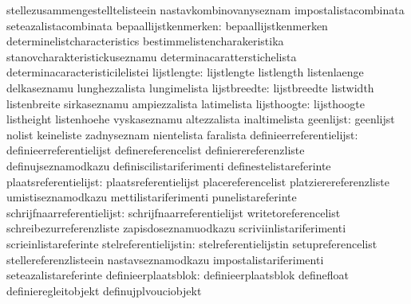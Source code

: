                                   stellezusammengestelltelisteein  nastavkombinovanyseznam
                                  impostalistacombinata            seteazalistacombinata
           bepaallijstkenmerken:  bepaallijstkenmerken             determinelistcharacteristics
                                  bestimmelistencharakeristika     stanovcharakteristickuseznamu
                                  determinacaratterstichelista     determinacaracteristicilelistei
                    lijstlengte:  lijstlengte                      listlength
                                  listenlaenge                     delkaseznamu
                                  lunghezzalista                   lungimelista
                   lijstbreedte:  lijstbreedte                     listwidth
                                  listenbreite                     sirkaseznamu
                                  ampiezzalista                    latimelista
                    lijsthoogte:  lijsthoogte                      listheight
                                  listenhoehe                      vyskaseznamu
                                  altezzalista                     inaltimelista
                      geenlijst:  geenlijst                        nolist
                                  keineliste                       zadnyseznam
                                  nientelista                      faralista
        definieerreferentielijst: definieerreferentielijst         definereferencelist
                                  definierereferenzliste           definujseznamodkazu
                                  definiscilistariferimenti        definestelistareferinte
           plaatsreferentielijst: plaatsreferentielijst            placereferencelist
                                  platzierereferenzliste           umistiseznamodkazu
                                  mettilistariferimenti            punelistareferinte
      schrijfnaarreferentielijst: schrijfnaarreferentielijst       writetoreferencelist
                                  schreibezurreferenzliste         zapisdoseznamuodkazu
                                  scriviinlistariferimenti         scrieinlistareferinte
           stelreferentielijstin: stelreferentielijstin            setupreferencelist
                                  stellereferenzlisteein           nastavseznamodkazu
                                  impostalistariferimenti          seteazalistareferinte
             definieerplaatsblok: definieerplaatsblok              definefloat
                                  definieregleitobjekt             definujplvouciobjekt
